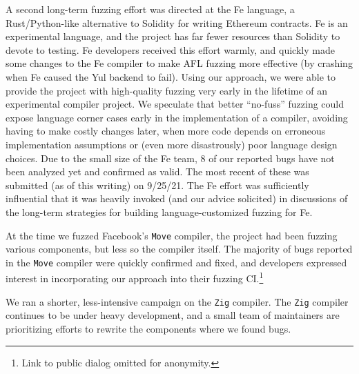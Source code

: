 A second long-term fuzzing effort was directed at the Fe language, a Rust/Python-like alternative to Solidity for writing Ethereum contracts.  Fe is an experimental language, and the project has far fewer resources than Solidity to devote to testing.  Fe developers received this effort warmly, and quickly made some changes to the Fe compiler to make AFL fuzzing more effective (by crashing when Fe caused the Yul backend to fail).  Using our approach, we were able to provide the project with high-quality fuzzing very early in the lifetime of an experimental compiler project.  We speculate that better ``no-fuss'' fuzzing could expose language corner cases early in the implementation of a compiler, avoiding having to make costly changes later, when more code depends on erroneous implementation assumptions or (even more disastrously) poor language design choices.  Due to the small size of the Fe team, 8 of our reported bugs have not been analyzed yet and confirmed as valid.  The most recent of these was submitted (as of this writing) on 9/25/21.  The Fe effort was sufficiently influential that it was heavily invoked (and our advice solicited) in discussions of the long-term strategies for building language-customized fuzzing for Fe.

At the time we fuzzed Facebook's \texttt{Move} compiler, the project had been fuzzing various components, but less so the compiler itself.
The majority of bugs reported in the \texttt{Move} compiler were quickly confirmed and fixed, and developers expressed interest in incorporating our approach into their fuzzing CI.\footnote{Link to public dialog omitted for anonymity.}  %


We ran a shorter, less-intensive campaign on the \texttt{Zig} compiler.  The
\texttt{Zig} compiler continues to be under heavy development, and a small team
of maintainers are prioritizing efforts to rewrite the components where we found
bugs.
